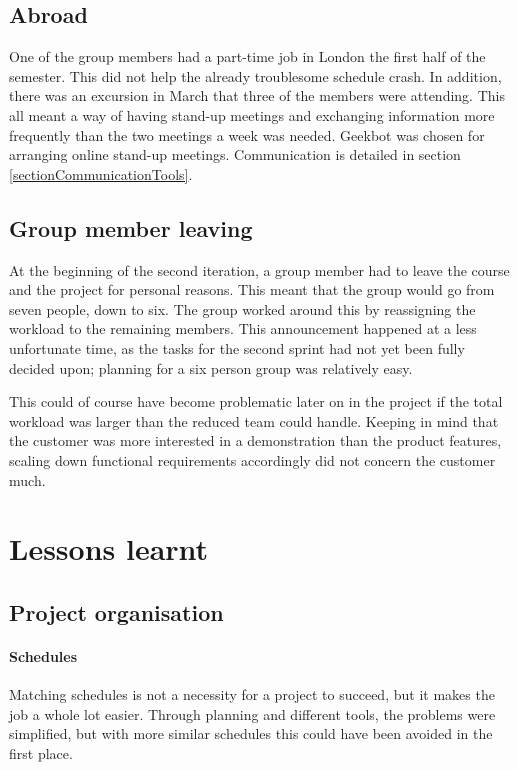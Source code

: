 \subsection{Abroad}
\noindent One of the group members had a part-time job in London the first half of the semester. This did not help the already troublesome schedule crash.
In addition, there was an excursion in March that three of the members were attending. This all meant a way of having stand-up meetings and exchanging information more frequently than the two meetings a week was needed. Geekbot was chosen for arranging online stand-up meetings. Communication is detailed in section \ref{sectionCommunicationTools}.

\subsection{Group member leaving}
At the beginning of the second iteration, a group member had to leave the course and the project for personal reasons. This meant that the group would go from seven people, down to six. The group worked around this by reassigning the workload to the remaining members. This announcement happened at a less unfortunate time, as the tasks for the second sprint had not yet been fully decided upon; planning for a six person group was relatively easy. 

This could of course have become problematic later on in the project if the total workload was larger than the reduced team could handle. Keeping in mind that the customer was more interested in a demonstration than the product features, scaling down functional requirements accordingly did not concern the customer much.

\section{Lessons learnt}

\subsection{Project organisation}

\paragraph{Schedules} Matching schedules is not a necessity for a project to succeed, but it makes the job a whole lot easier. Through planning and different tools, the problems were simplified, but with more similar schedules this could have been avoided in the first place. 

